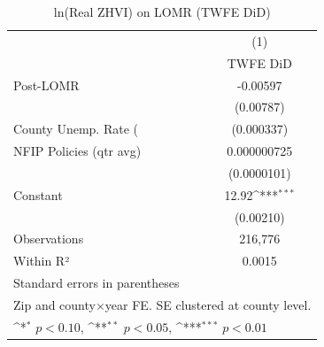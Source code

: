 \begin{table}[htbp]\centering
\def\sym#1{\ifmmode^{#1}\else\(^{#1}\)\fi}
\caption{ln(Real ZHVI) on LOMR (TWFE DiD)}
\begin{tabular}{l*{1}{c}}
\hline\hline
                    &\multicolumn{1}{c}{(1)}\\
                    &\multicolumn{1}{c}{TWFE DiD}\\
\hline
Post-LOMR           &    -0.00597         \\
                    &   (0.00787)         \\
[1em]
County Unemp. Rate (%
                    &  (0.000337)         \\
[1em]
NFIP Policies (qtr avg)& 0.000000725         \\
                    & (0.0000101)         \\
[1em]
Constant            &       12.92\sym{***}\\
                    &   (0.00210)         \\
\hline
Observations        &     216,776         \\
Within R²           &      0.0015         \\
\hline\hline
\multicolumn{2}{l}{\footnotesize Standard errors in parentheses}\\
\multicolumn{2}{l}{\footnotesize Zip and county×year FE. SE clustered at county level.}\\
\multicolumn{2}{l}{\footnotesize \sym{*} \(p<0.10\), \sym{**} \(p<0.05\), \sym{***} \(p<0.01\)}\\
\end{tabular}
\end{table}
